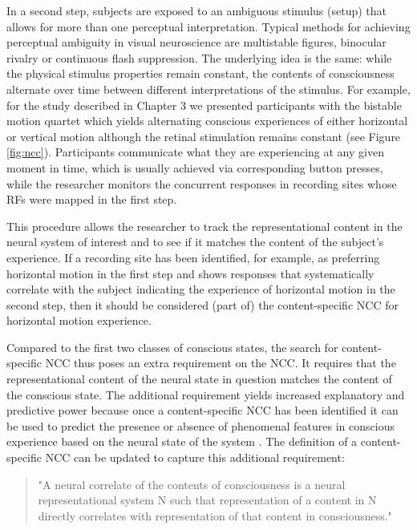 In a second step, subjects are exposed to an ambiguous stimulus (setup) that allows for more than one perceptual interpretation. Typical methods for achieving perceptual ambiguity in visual neuroscience are multistable figures, binocular rivalry or continuous flash suppression. The underlying idea is the same: while the physical stimulus properties remain constant, the contents of consciousness alternate over time between different interpretations of the stimulus. For example, for the study described in Chapter 3 we presented participants with the bistable motion quartet \parencite{Ramachandran1985} which yields alternating conscious experiences of either horizontal or vertical motion although the retinal stimulation remains constant (see Figure \ref{fig:ncc}). Participants communicate what they are experiencing at any given moment in time, which is usually achieved via corresponding button presses, while the researcher monitors the concurrent responses in recording sites whose RFs were mapped in the first step.

This procedure allows the researcher to track the representational content in the neural system of interest and to see if it matches the content of the subject's experience. If a recording site has been identified, for example, as preferring horizontal motion in the first step and shows responses that systematically correlate with the subject indicating the experience of horizontal motion in the second step, then it should be considered (part of) the content-specific NCC for horizontal motion experience.

Compared to the first two classes of conscious states, the search for content-specific NCC thus poses an extra requirement on the NCC. It requires that the representational content of the neural state in question matches the content of the conscious state. The additional requirement yields increased explanatory and predictive power because once a content-specific NCC has been identified it can be used to predict the presence or absence of phenomenal features in conscious experience based on the neural state of the system \parencite{Chalmers2000}. The definition of a content-specific NCC can be updated to capture this additional requirement:

\begin{quotation}
"A neural correlate of the contents of consciousness is a neural representational system N such that representation of a content in N directly correlates with representation of that content in consciousness." \parencite[page 6]{Chalmers2000}
\end{quotation}

